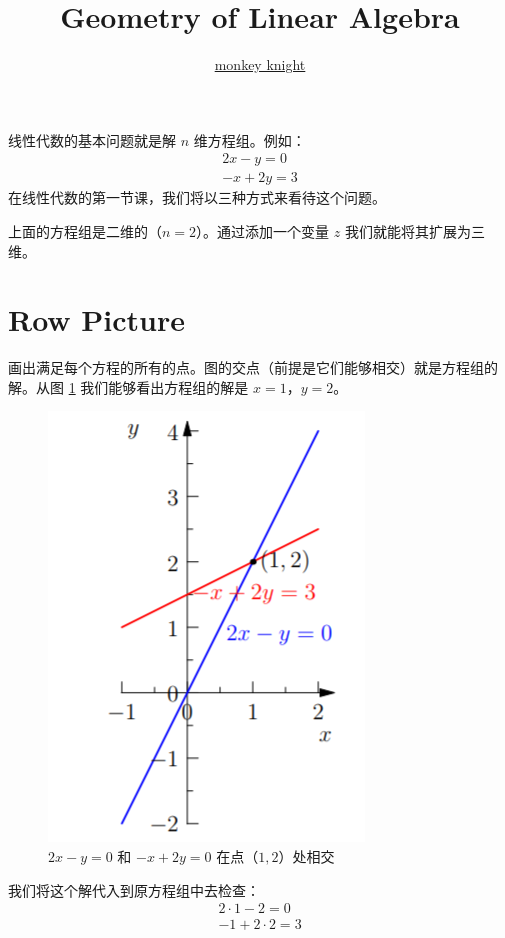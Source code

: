 \documentclass[green, cn, normal]{elegantnote}
\title{Geometry of Linear Algebra}
\author{\href{https://monkey-knight.github.io/}{monkey knight}}
\begin{document}
	\maketitle
	
	线性代数的基本问题就是解 $n$ 维方程组。例如：
	\[
	\begin{matrix}
	2x - y = 0 \\
	-x + 2y = 3
	\end{matrix}
	\]
	在线性代数的第一节课，我们将以三种方式来看待这个问题。
	
	上面的方程组是二维的（$n=2$）。通过添加一个变量 $z$ 我们就能将其扩展为三维。
	
	\section{Row Picture}
	
	画出满足每个方程的所有的点。图的交点（前提是它们能够相交）就是方程组的解。从图 \ref{fig:intersection} 我们能够看出方程组的解是 $x=1$，$y=2$。
	
	\begin{figure}[!htbp]
		\centering
		\includegraphics[scale=0.6]{1.png}
		\caption{$2x-y=0$ 和 $-x + 2y = 0$ 在点（$1, 2$）处相交}
		\label{fig:intersection}
	\end{figure}

	我们将这个解代入到原方程组中去检查：
	\[
	\begin{matrix}
	2 \cdot 1 - 2 = 0 \\
	-1 + 2 \cdot 2 = 3
	\end{matrix}
	\]
	
\end{document}
